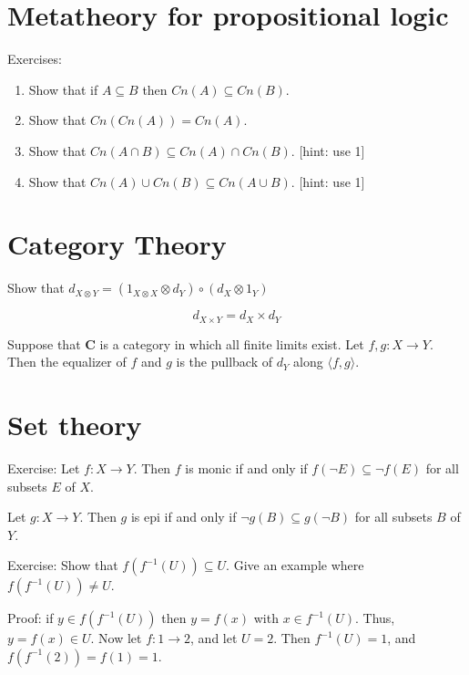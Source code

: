 \documentclass[11pt]{article}
\theoremstyle{definition}
\theoremstyle{remark}
\begin{document}
\section{Metatheory for propositional logic}

Exercises:
\begin{enumerate}
\item Show that if $A\subseteq B$ then $Cn(A)\subseteq Cn(B)$.
\item Show that $Cn(Cn(A))=Cn(A)$.
\item Show that $Cn(A\cap B)\subseteq Cn(A)\cap Cn(B)$. [hint: use 1]  
\item Show that $Cn(A)\cup Cn(B)\subseteq Cn(A\cup B)$. [hint: use 1]
\end{enumerate}


\section{Category Theory}

Show that $d_{X\otimes Y}= (1_{X\otimes X}\otimes d_Y) \circ (d_X\otimes 1_Y)$

\[ d_{X\times Y}=d_X\times d_Y \]


Suppose that $\mathbf{C}$ is a category in which all finite limits
exist.  Let $f,g:X\to Y$.  Then the equalizer of $f$ and $g$ is
the pullback of $d_Y$ along $\langle f,g\rangle$.



\section{Set theory}

Exercise: Let $f:X\to Y$.  Then $f$ is monic if and only if $f(\neg
E)\subseteq \neg f(E)$ for all subsets $E$ of $X$.

Let $g:X\to Y$.  Then $g$ is epi if and only if $\neg g(B)\subseteq
g(\neg B)$ for all subsets $B$ of $Y$.



Exercise: Show that $f(f^{-1}(U))\subseteq U$.  Give an example where
$f(f^{-1}(U))\neq U$.  

Proof: if $y\in f(f^{-1}(U))$ then $y=f(x)$ with $x\in f^{-1}(U)$.
Thus, $y=f(x)\in U$.  Now let $f:1\to 2$, and let $U=2$.  Then
$f^{-1}(U)=1$, and $f(f^{-1}(2))=f(1)=1$. 
\end{document}
